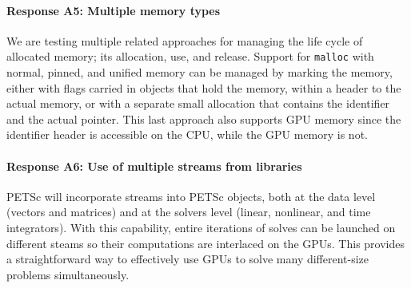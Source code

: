 \documentclass[10pt,journal,compsoc]{IEEEtran}
\begin{document}
\paragraph{Response A5: Multiple memory types}

We are testing multiple related approaches for managing the life cycle of
allocated memory; its allocation, use, and release. Support for {\tt malloc} with normal,
pinned, and unified memory can be managed by marking the memory, either with flags carried in objects that hold the memory, 
within a header to the actual memory, or with a separate small allocation that contains the identifier and the actual pointer. This last approach also supports GPU memory since the identifier header
is accessible on the CPU, while the GPU memory is not.


\paragraph{Response A6: Use of multiple streams from libraries}
PETSc will incorporate streams into PETSc objects, both at the data level (vectors and matrices) and at the solvers level (linear, nonlinear, and time integrators). With this capability, entire iterations of 
solves can be launched on different steams so their computations are interlaced on the GPUs.  This provides a straightforward way to effectively use GPUs to solve many different-size problems simultaneously.



\end{document}
